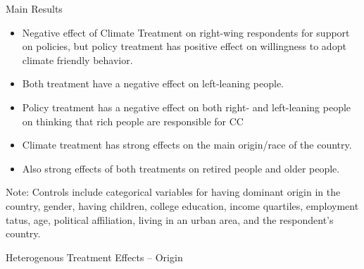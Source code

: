 \begin{frame}{Main Results}
\begin{itemize}
	\item Negative effect of Climate Treatment on right-wing respondents for support on policies, but policy treatment has positive effect on willingness to adopt climate friendly behavior.
	\item Both treatment have a negative effect on left-leaning people.
	\item Policy treatment has a negative effect on both right- and left-leaning people on thinking that rich people are responsible for CC \newline %
	\item Climate treatment has strong effects on the main origin/race of the country. \newline
	\item Also strong effects of both treatments on retired people and older people.
\end{itemize}
\end{frame}


\begin{frame}{}%
\begin{table}[h!]
\begin{center}
\scalebox{.4}{}
\end{center}
	{\fontsize{4}{6}\selectfont Note: Controls include categorical variables for having dominant origin in the country, gender, having children, college education,
income quartiles, employment tatus, age, political affiliation, living in an urban area, and the respondent's country.}
\end{table}
\end{frame}

\begin{frame}{}%
\begin{table}[h!]
\caption{Heterogenous Treatment Effects -- Origin}
\begin{center}
\scalebox{.45}{}
\end{center}
\end{table}
\end{frame}

